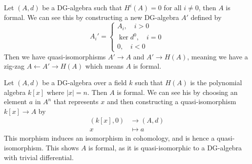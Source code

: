 \begin{example}
Let $(A, d)$ be a DG-algebra such that $H^i(A) = 0$ for all $i\neq 0$, then $A$ is formal. We can see this by constructing a new DG-algebra $A'$ defined by
\begin{equation*}
A_i'=
\begin{cases}
    A_i, \quad i > 0 \\
    \ker d^0, \quad i=0 \\
    0, \quad i < 0
\end{cases}    
\end{equation*}
Then we have quasi-isomorphisms $A'\longrightarrow A$ and $A'\longrightarrow H(A)$, meaning we have a zig-zag $A\longleftarrow A' \longrightarrow H(A)$ which means $A$ is formal. 
\end{example}

\begin{example}
Let $(A, d)$ be a DG-algebra over a field $k$ such that $H(A)$ is the polynomial algebra $k[x]$ where $|x|=n$. Then $A$ is formal. We can see his by choosing an element $a$ in $A^n$ that represents $x$ and then constructing a quasi-isomorphism $k[x]\longrightarrow A$ by
\begin{align*}
    (k[x], 0)&\longrightarrow (A,d) \\
    x &\longmapsto a
\end{align*} 
This morphism induces an isomorphism in cohomology, and is hence a quasi-isomorphism. This shows $A$ is formal, as it is quasi-isomorphic to a DG-algebra with trivial differential. 
\end{example}














